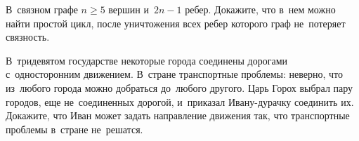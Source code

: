 \begin{problems}
\item
В~связном графе $n \geq 5$ вершин и~$2 n - 1$ ребер.
Докажите, что в~нем можно найти простой цикл, после уничтожения всех ребер
которого граф не~потеряет связность.


\item
В~тридевятом государстве некоторые города соединены дорогами с~односторонним
движением.
В~стране транспортные проблемы: неверно, что из~любого города можно добраться
до~любого другого.
Царь Горох выбрал пару городов, еще не~соединенных дорогой, и~приказал
Ивану-дурачку соединить их.
Докажите, что Иван может задать направление движения так, что транспортные
проблемы в~стране не~решатся.



\end{problems}

